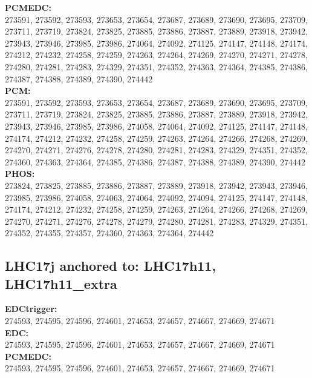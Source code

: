  \textbf{PCMEDC:}\\
273591, 273592, 273593, 273653, 273654, 273687, 273689, 273690, 273695, 273709, 273711, 273719, 273824, 273825, 273885, 273886, 273887, 273889, 273918, 273942, 273943, 273946, 273985, 273986, 274064, 274092, 274125, 274147, 274148, 274174, 274212, 274232, 274258, 274259, 274263, 274264, 274269, 274270, 274271, 274278, 274280, 274281, 274283, 274329, 274351, 274352, 274363, 274364, 274385, 274386, 274387, 274388, 274389, 274390, 274442\\

 \textbf{PCM:}\\
273591, 273592, 273593, 273653, 273654, 273687, 273689, 273690, 273695, 273709, 273711, 273719, 273824, 273825, 273885, 273886, 273887, 273889, 273918, 273942, 273943, 273946, 273985, 273986, 274058, 274064, 274092, 274125, 274147, 274148, 274174, 274212, 274232, 274258, 274259, 274263, 274264, 274266, 274268, 274269, 274270, 274271, 274276, 274278, 274280, 274281, 274283, 274329, 274351, 274352, 274360, 274363, 274364, 274385, 274386, 274387, 274388, 274389, 274390, 274442\\

 \textbf{PHOS:}\\
273824, 273825, 273885, 273886, 273887, 273889, 273918, 273942, 273943, 273946, 273985, 273986, 274058, 274063, 274064, 274092, 274094, 274125, 274147, 274148, 274174, 274212, 274232, 274258, 274259, 274263, 274264, 274266, 274268, 274269, 274270, 274271, 274276, 274278, 274279, 274280, 274281, 274283, 274329, 274351, 274352, 274355, 274357, 274360, 274363, 274364, 274442\\

 \subsection{LHC17j anchored to: LHC17h11, LHC17h11\_extra}

 \textbf{EDCtrigger:}\\
274593, 274595, 274596, 274601, 274653, 274657, 274667, 274669, 274671\\

 \textbf{EDC:}\\
274593, 274595, 274596, 274601, 274653, 274657, 274667, 274669, 274671\\

 \textbf{PCMEDC:}\\
274593, 274595, 274596, 274601, 274653, 274657, 274667, 274669, 274671\\

